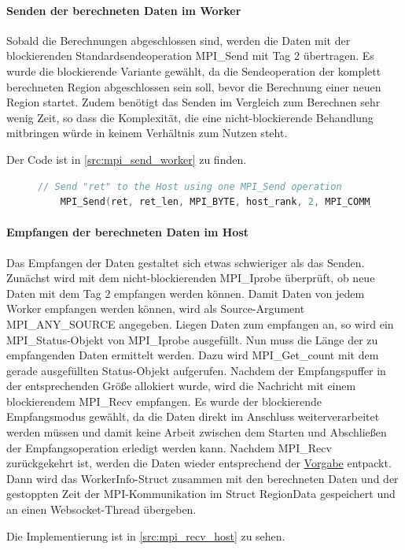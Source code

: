 \paragraph{Senden der berechneten Daten im Worker}\label{para:send_worker}

Sobald die Berechnungen abgeschlossen sind, werden die Daten mit der blockierenden Standardsendeoperation MPI\_Send mit Tag 2 übertragen. Es wurde die blockierende Variante gewählt, da die Sendeoperation der komplett berechneten Region abgeschlossen sein soll, bevor die Berechnung einer neuen Region startet. Zudem benötigt das Senden im Vergleich zum Berechnen sehr wenig Zeit, so dass die Komplexität, die eine nicht-blockierende Behandlung mitbringen würde in keinem Verhältnis zum Nutzen steht.

Der Code ist in \autoref{src:mpi_send_worker} zu finden.

\begin{figure}[h!]
	\begin{lstlisting}[language=c++, caption={Senden der berechneten Daten im Worker}, label={src:mpi_send_worker}, firstnumber=161]
	// Send "ret" to the Host using one MPI_Send operation
	MPI_Send(ret, ret_len, MPI_BYTE, host_rank, 2, MPI_COMM_WORLD);
	\end{lstlisting}
\end{figure}

\paragraph{Empfangen der berechneten Daten im Host}\label{para:recv_host}

Das Empfangen der Daten gestaltet sich etwas schwieriger als das Senden. Zunächst wird mit dem nicht-blockierenden MPI\_Iprobe überprüft, ob neue Daten mit dem Tag 2 empfangen werden können. Damit Daten von jedem Worker empfangen werden können, wird als Source-Argument MPI\_ANY\_SOURCE angegeben. Liegen Daten zum empfangen an, so wird ein MPI\_Status-Objekt von MPI\_Iprobe ausgefüllt. Nun muss die Länge der zu empfangenden Daten ermittelt werden. Dazu wird MPI\_Get\_count mit dem gerade ausgefüllten Status-Objekt aufgerufen. Nachdem der Empfangspuffer in der entsprechenden Größe allokiert wurde, wird die Nachricht mit einem blockierendem MPI\_Recv empfangen. Es wurde der blockierende Empfangsmodus gewählt, da die Daten direkt im Anschluss weiterverarbeitet werden müssen und damit keine Arbeit zwischen dem Starten und Abschließen der Empfangsoperation erledigt werden kann. Nachdem MPI\_Recv zurückgekehrt ist, werden die Daten wieder entsprechend der \hyperref[para:struktur_daten]{Vorgabe} entpackt. Dann wird das WorkerInfo-Struct zusammen mit den berechneten Daten und der gestoppten Zeit der MPI-Kommunikation im Struct RegionData gespeichert und an einen Websocket-Thread übergeben.

Die Implementierung ist in \autoref{src:mpi_recv_host} zu sehen.

\begin{figure}[h!]
	
\end{figure}